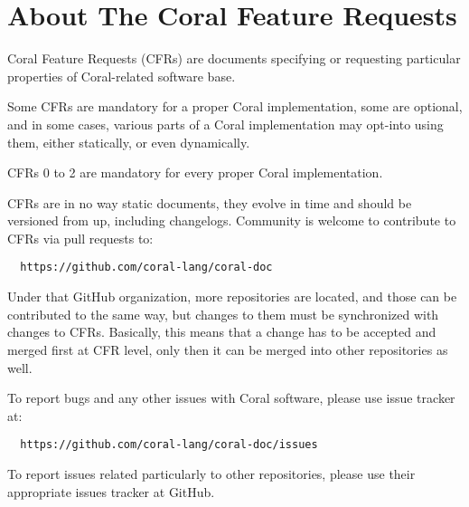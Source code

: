 
\chapter{About The Coral Feature Requests}
\label{sec:about}

Coral Feature Requests (CFRs) are documents specifying or requesting particular properties of Coral-related software base. 

Some CFRs are mandatory for a proper Coral implementation, some are optional, and in some cases, various parts of a Coral implementation may opt-into using them, either statically, or even dynamically. 

CFRs 0 to 2 are mandatory for every proper Coral implementation. 

CFRs are in no way static documents, they evolve in time and should be versioned from  up, including changelogs. Community is welcome to contribute to CFRs via pull requests to:

\begin{lstlisting}
  https://github.com/coral-lang/coral-doc
\end{lstlisting}

Under that GitHub organization, more repositories are located, and those can be contributed to the same way, but changes to them must be synchronized with changes to CFRs. Basically, this means that a change has to be accepted and merged first at CFR level, only then it can be merged into other repositories as well. 

To report bugs and any other issues with Coral software, please use issue tracker at:

\begin{lstlisting}
  https://github.com/coral-lang/coral-doc/issues
\end{lstlisting}

To report issues related particularly to other repositories, please use their appropriate issues tracker at GitHub. 






